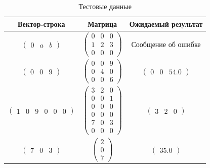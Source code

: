 \begin{table}
	\begin{center}
		\begin{tabular}{|c|c|c|}
			\hline
			Вектор-строка & Матрица & Ожидаемый результат \\
			\hline
			$\begin{pmatrix}
			0 & a & b
			\end{pmatrix}$ &
			$\begin{pmatrix}
			0 & 0 & 0 \\
			1 & 2 & 3 \\
			0 & 0 & 0
			\end{pmatrix}$ &
			Сообщение об ошибке \\
			\hline
			$\begin{pmatrix}
			0 & 0 & 9
			\end{pmatrix}$ &
			$\begin{pmatrix}
			0 & 0 & 9 \\
			0 & 4 & 0 \\
			0 & 0 & 6
			\end{pmatrix}$ &
			$\begin{pmatrix}
			0 & 0 & 54.0
			\end{pmatrix}$ \\
			\hline
			$\begin{pmatrix}
			1 & 0 & 9 & 0 & 0 & 0
			\end{pmatrix}$ &
			$\begin{pmatrix}
			3 & 2 & 0 \\
			0 & 0 & 1 \\
			0 & 0 & 0 \\
			0 & 0 & 0 \\
			7 & 0 & 3 \\
			0 & 0 & 0
			\end{pmatrix}$ &
			$\begin{pmatrix}
			3 & 2 & 0
			\end{pmatrix}$ \\
			\hline
			$\begin{pmatrix}
			7 & 0 & 3
			\end{pmatrix}$ &
			$\begin{pmatrix}
			2 \\
			0 \\
			7
			\end{pmatrix}$ &
			$\begin{pmatrix}
			35.0
			\end{pmatrix}$ \\
			\hline
		\end{tabular}
	\end{center}
	\caption{Тестовые данные}
\end{table}

